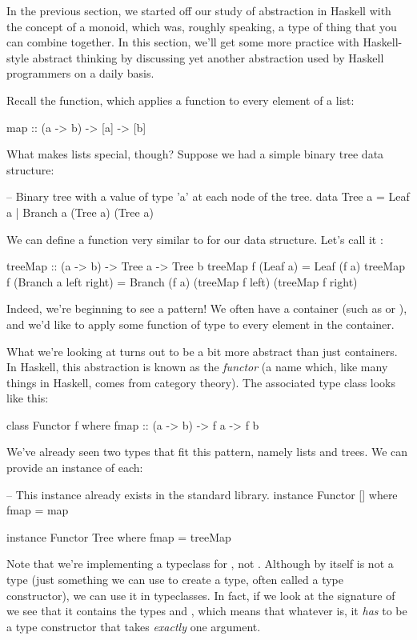 In the previous section, we started off our study of abstraction in Haskell with the concept of a
monoid, which was, roughly speaking, a type of thing that you can combine together. In this section,
we'll get some more practice with Haskell-style abstract thinking by discussing yet another
abstraction used by Haskell programmers on a daily basis.

Recall the  function, which applies a function to every element of a list:
\begin{haskell}
map :: (a -> b) -> [a] -> [b]
\end{haskell}

What makes lists special, though? Suppose we had a simple binary tree data structure:
\begin{haskell}
-- Binary tree with a value of type 'a' at each node of the tree.
data Tree a = Leaf a | Branch a (Tree a) (Tree a)
\end{haskell}
We can define a function very similar to  for our  data structure. Let's
call it :
\begin{haskell}
treeMap :: (a -> b) -> Tree a -> Tree b
treeMap f (Leaf a) = Leaf (f a)
treeMap f (Branch a left right) =
  Branch (f a) (treeMap f left) (treeMap f right)
\end{haskell}

Indeed, we're beginning to see a pattern! We often have a container (such as \inline{[a]} or
), and we'd like to apply some function of type  to every element in
the container. 

What we're looking at turns out to be a bit more abstract than just containers. In Haskell, this
abstraction is known as the \emph{functor} (a name which, like many things in Haskell, comes from
category theory). The associated type class looks like this:
\begin{haskell}
class Functor f where
  fmap :: (a -> b) -> f a -> f b
\end{haskell}

We've already seen two types that fit this pattern, namely lists and trees. We can provide an
instance of each:
\begin{haskell}
-- This instance already exists in the standard library.
instance Functor [] where
  fmap = map

instance Functor Tree where
  fmap = treeMap
\end{haskell}

Note that we're implementing a typeclass for , not . Although
 by itself is not a type (just something we can use to create a type, often called a
type constructor), we can use it in typeclasses. In fact, if we look at the signature of
 we see that it contains the types  and , which means that
whatever  is, it \emph{has} to be a type constructor that takes \emph{exactly} one
argument.

